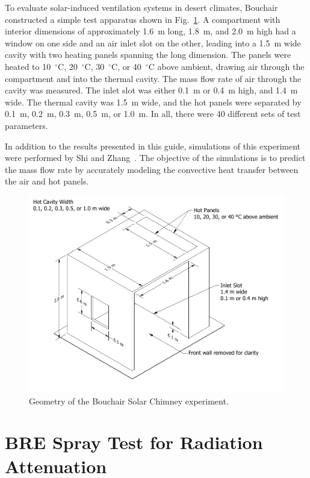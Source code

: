 To evaluate solar-induced ventilation systems in desert climates, Bouchair~\cite{Bouchair:Thesis} constructed a simple test apparatus shown in Fig.~\ref{Bouchair_Drawing}. A compartment with interior dimensions of approximately 1.6~m long, 1.8~m, and 2.0~m high had a window on one side and an air inlet slot on the other, leading into a 1.5~m wide cavity with two heating panels spanning the long dimension. The panels were heated to 10~$^\circ$C, 20~$^\circ$C, 30~$^\circ$C, or 40~$^\circ$C above ambient, drawing air through the compartment and into the thermal cavity. The mass flow rate of air through the cavity was measured. The inlet slot was either 0.1~m or 0.4~m high, and 1.4~m wide. The thermal cavity was 1.5~m wide, and the hot panels were separated by 0.1~m, 0.2~m, 0.3~m, 0.5~m, or 1.0~m. In all, there were 40 different sets of test parameters.

In addition to the results presented in this guide, simulations of this experiment were performed by Shi and Zhang~\cite{Shi:BE2016}. The objective of the simulations is to predict the mass flow rate by accurately modeling the convective heat transfer between the air and hot panels.

\begin{figure}[!ht]
\includegraphics[trim={16in 2.5in 16in 2.5in},clip,width=\textwidth]{FIGURES/Bouchair_Solar_Chimney/Bouchair_Solar_Chimney}
\caption[Geometry of the Bouchair Solar Chimney experiment]{Geometry of the Bouchair Solar Chimney experiment.}
\label{Bouchair_Drawing}
\end{figure}


\section{BRE Spray Test for Radiation Attenuation}
\label{BRE_Spray_Description}

